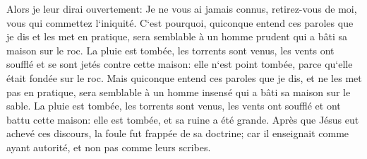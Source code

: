 \verse Alors je leur dirai ouvertement: Je ne vous ai jamais connus, retirez-vous de moi, vous qui commettez l`iniquité. 
\verse C`est pourquoi, quiconque entend ces paroles que je dis et les met en pratique, sera semblable à un homme prudent qui a bâti sa maison sur le roc. 
\verse La pluie est tombée, les torrents sont venus, les vents ont soufflé et se sont jetés contre cette maison: elle n`est point tombée, parce qu`elle était fondée sur le roc. 
\verse Mais quiconque entend ces paroles que je dis, et ne les met pas en pratique, sera semblable à un homme insensé qui a bâti sa maison sur le sable. 
\verse La pluie est tombée, les torrents sont venus, les vents ont soufflé et ont battu cette maison: elle est tombée, et sa ruine a été grande. 
\verse Après que Jésus eut achevé ces discours, la foule fut frappée de sa doctrine; 
\verse car il enseignait comme ayant autorité, et non pas comme leurs scribes. 

\chapter{}

